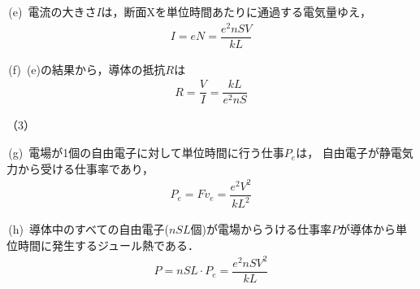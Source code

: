 \noindent\,(e)\,
電流の大きさ$I$は，断面Xを単位時間あたりに通過する電気量ゆえ，
\begin{align*}
  I = eN = \dfrac{e^2nSV}{kL}
\end{align*}

\noindent\,(f)\,
(e)の結果から，導体の抵抗$R$は
\begin{align*}
  R = \dfrac{V}{I} = \dfrac{kL}{e^2nS}
\end{align*}

\noindent （3）\par 
\noindent\,(g)\,
電場が1個の自由電子に対して単位時間に行う仕事$P_e$は，
自由電子が静電気力から受ける仕事率であり，
\begin{align*}
  P_e = Fv_e = \dfrac{e^2V^2}{kL^2}
\end{align*}

\noindent\,(h)\,
導体中のすべての自由電子($nSL$個)が電場からうける仕事率$P$が導体から単位時間に発生するジュール熱である．
\begin{align*}
  P = nSL\cdot P_e = \dfrac{e^2nSV^2}{kL}
\end{align*}

